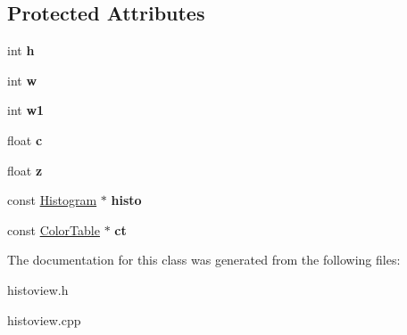 \subsection*{Protected Attributes}
\begin{DoxyCompactItemize}
\item 
\hypertarget{classHistoView_a5e10258f9c3400e9d8d643cfcc1b01c0}{
int {\bfseries h}}
\label{classHistoView_a5e10258f9c3400e9d8d643cfcc1b01c0}

\item 
\hypertarget{classHistoView_a4f85c8c8a48c83f2f4dcd9c5ed8a4fd0}{
int {\bfseries w}}
\label{classHistoView_a4f85c8c8a48c83f2f4dcd9c5ed8a4fd0}

\item 
\hypertarget{classHistoView_a2fdf1116fb830a3e1cbf71b2607ab1e2}{
int {\bfseries w1}}
\label{classHistoView_a2fdf1116fb830a3e1cbf71b2607ab1e2}

\item 
\hypertarget{classHistoView_a26937d683f37aec871b920b7fa0e4633}{
float {\bfseries c}}
\label{classHistoView_a26937d683f37aec871b920b7fa0e4633}

\item 
\hypertarget{classHistoView_a27330e368bd8b8f850b5c066abc9e65a}{
float {\bfseries z}}
\label{classHistoView_a27330e368bd8b8f850b5c066abc9e65a}

\item 
\hypertarget{classHistoView_a87cdd3bfabb8136f4a5ae6e42833336e}{
const \hyperlink{classHistogram}{Histogram} $\ast$ {\bfseries histo}}
\label{classHistoView_a87cdd3bfabb8136f4a5ae6e42833336e}

\item 
\hypertarget{classHistoView_a3b64be57f6a4f04f4c0ebb3819f580d8}{
const \hyperlink{classColorTable}{ColorTable} $\ast$ {\bfseries ct}}
\label{classHistoView_a3b64be57f6a4f04f4c0ebb3819f580d8}

\end{DoxyCompactItemize}


The documentation for this class was generated from the following files:\begin{DoxyCompactItemize}
\item 
histoview.h\item 
histoview.cpp\end{DoxyCompactItemize}
